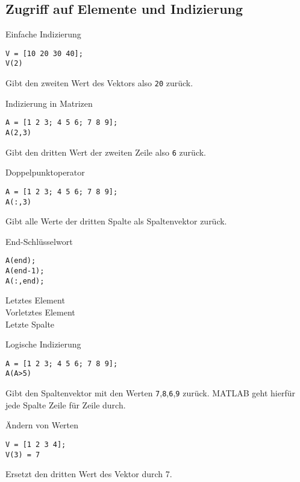         \subsection{Zugriff auf Elemente und Indizierung}
        \begin{CodeErklaerungBox}{Einfache Indizierung}
                \begin{lstlisting}
V = [10 20 30 40];
V(2)
                \end{lstlisting}
                \tcblower
                Gibt den zweiten Wert des Vektors also \texttt{20} zurück.
                \end{CodeErklaerungBox}
                \begin{CodeErklaerungBox}{Indizierung in Matrizen}
                \begin{lstlisting}
A = [1 2 3; 4 5 6; 7 8 9];
A(2,3)
                \end{lstlisting}
                \tcblower
                Gibt den dritten Wert der zweiten Zeile also \texttt{6} zurück.
            \end{CodeErklaerungBox}
            \begin{CodeErklaerungBox}{Doppelpunktoperator}
                \begin{lstlisting}
A = [1 2 3; 4 5 6; 7 8 9];
A(:,3)
                \end{lstlisting}
                \tcblower
                Gibt alle Werte der dritten Spalte als Spaltenvektor zurück.
            \end{CodeErklaerungBox}
            \begin{CodeErklaerungBox}{End-Schlüsselwort}
                \begin{lstlisting}
A(end);
A(end-1);
A(:,end);
                \end{lstlisting}
                \tcblower
                Letztes Element\\
                Vorletztes Element\\
                Letzte Spalte
            \end{CodeErklaerungBox}
            \begin{CodeErklaerungBox}{Logische Indizierung}
                \begin{lstlisting}
A = [1 2 3; 4 5 6; 7 8 9];
A(A>5)
                \end{lstlisting}
                \tcblower
                Gibt den Spaltenvektor mit den Werten \texttt{7},\texttt{8},\texttt{6},\texttt{9} zurück. MATLAB geht hierfür jede Spalte Zeile für Zeile durch.
            \end{CodeErklaerungBox}
            \begin{CodeErklaerungBox}{Ändern von Werten}
                \begin{lstlisting}
V = [1 2 3 4];
V(3) = 7
                \end{lstlisting}
                \tcblower
                Ersetzt den dritten Wert des Vektor durch 7.
            \end{CodeErklaerungBox}
